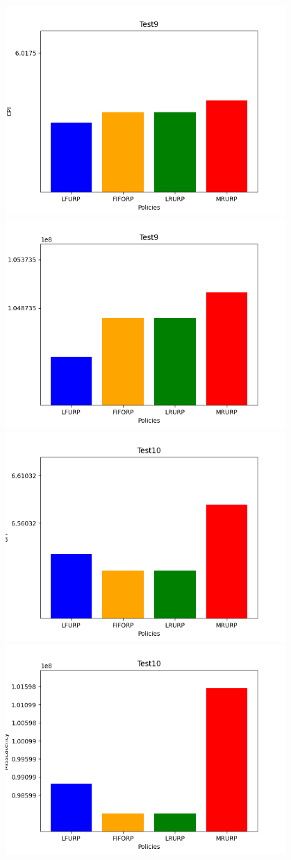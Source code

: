 ‫\includegraphics[width=0.8\textwidth]{graph/csv9CPI.png}\\
‫\includegraphics[width=0.8\textwidth]{graph/csv9Miss.png}\\
‫\includegraphics[width=0.8\textwidth]{graph/csv10CPI.png}\\
‫\includegraphics[width=0.8\textwidth]{graph/csv10Miss.png}\\